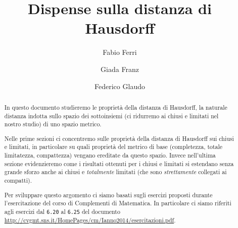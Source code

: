 \documentclass[a4paper,12pt]{article}
\title{Dispense sulla distanza di Hausdorff}
\author{Fabio Ferri \and Giada Franz \and Federico Glaudo}
\begin{document}
\maketitle


\begin{abstract}
	In questo documento studieremo le proprietà della distanza di Hausdorff, la naturale distanza indotta sullo spazio dei sottoinsiemi (ci ridurremo ai chiusi e limitati nel nostro studio) di uno spazio metrico. 
	
	Nelle prime sezioni ci concentremo sulle proprietà della distanza di Hausdorff sui chiusi e limitati, in particolare su quali proprietà del metrico di base (completezza, totale limitatezza, compattezza) vengano ereditate da questo spazio. 
	Invece nell'ultima sezione evidenzieremo come i risultati ottenuti per i chiusi e limitati si estendano senza grande sforzo anche ai chiusi e \emph{totalmente} limitati (che sono \emph{strettamente} collegati ai compatti).

	Per sviluppare questo argomento ci siamo basati sugli esercizi proposti durante l'esercitazione del corso di Complementi di Matematica. In particolare ci siamo riferiti agli esercizi dal \texttt{6.20} al \texttt{6.25} del documento \url{http://cvgmt.sns.it/HomePages/cm/Ianno2014/esercitazioni.pdf}.
\end{abstract}
\clearpage






\end{document}
